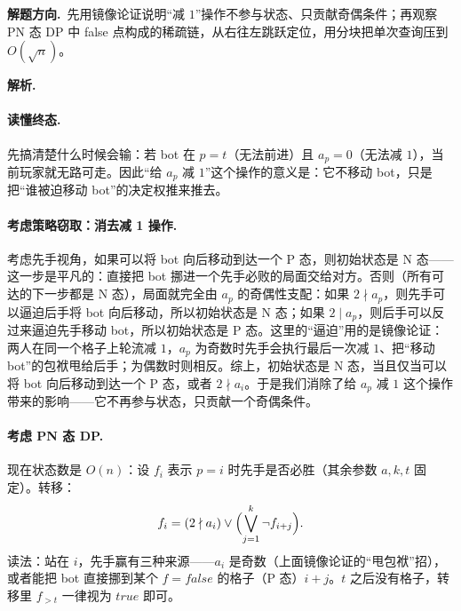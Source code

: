 \documentclass[UTF8,a4paper,11pt,oneside,openany,fontset=fandol]{ctexbook}
\theoremstyle{definition}
\newcommand{\sol}{\par\noindent\textbf{解析.}\ }
\newcommand{\hint}{\par\noindent\textbf{解题方向.}\ }
\begin{document}
\hint 先用镜像论证说明“减 $1$”操作不参与状态、只贡献奇偶条件；再观察 PN 态 DP 中 false 点构成的稀疏链，从右往左跳跃定位，用分块把单次查询压到 $O(\sqrt n)$。

\sol \paragraph{读懂终态.} 先搞清楚什么时候会输：若 bot 在 $p=t$（无法前进）且 $a_p=0$（无法减 $1$），当前玩家就无路可走。因此“给 $a_p$ 减 $1$”这个操作的意义是：它不移动 bot，只是把“谁被迫移动 bot”的决定权推来推去。

\paragraph{考虑策略窃取：消去减 1 操作.} 考虑先手视角，如果可以将 bot 向后移动到达一个 P 态，则初始状态是 N 态——这一步是平凡的：直接把 bot 挪进一个先手必败的局面交给对方。否则（所有可达的下一步都是 N 态），局面就完全由 $a_p$ 的奇偶性支配：如果 $2\nmid a_p$，则先手可以逼迫后手将 bot 向后移动，所以初始状态是 N 态；如果 $2\mid a_p$，则后手可以反过来逼迫先手移动 bot，所以初始状态是 P 态。这里的“逼迫”用的是镜像论证：两人在同一个格子上轮流减 $1$，$a_p$ 为奇数时先手会执行最后一次减 $1$、把“移动 bot”的包袱甩给后手；为偶数时则相反。综上，初始状态是 N 态，当且仅当可以将 bot 向后移动到达一个 P 态，或者 $2\nmid a_i$。于是我们消除了给 $a_p$ 减 $1$ 这个操作带来的影响——它不再参与状态，只贡献一个奇偶条件。

\paragraph{考虑 PN 态 DP.} 现在状态数是 $O(n)$：设 $f_i$ 表示 $p=i$ 时先手是否必胜（其余参数 $a,k,t$ 固定）。转移：
\[
 f_i=(2\nmid a_i)\lor\Bigl(\bigvee_{j=1}^{k}\lnot f_{i+j}\Bigr).
\]
读法：站在 $i$，先手赢有三种来源——$a_i$ 是奇数（上面镜像论证的“甩包袱”招），或者能把 bot 直接挪到某个 $f=false$ 的格子（P 态）$i+j$。$t$ 之后没有格子，转移里 $f_{>t}$ 一律视为 $true$ 即可。
\end{document}
